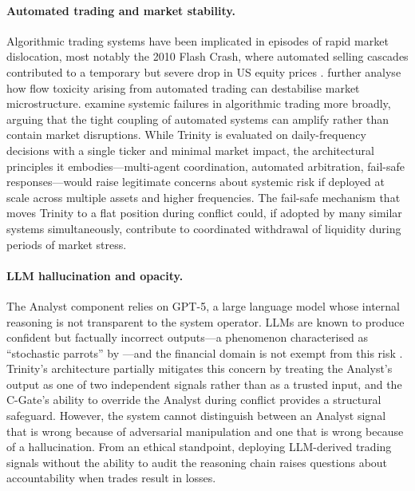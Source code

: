 \paragraph{Automated trading and market stability.}
Algorithmic trading systems have been implicated in episodes of rapid market
dislocation, most notably the 2010 Flash Crash, where automated selling
cascades contributed to a temporary but severe drop in US equity prices
\cite{kirilenko2017flash}. \cite{easley2011} further analyse how flow toxicity
arising from automated trading can destabilise market microstructure.
\cite{doi:10.1177/03063127211048515} examine systemic failures in algorithmic
trading more broadly, arguing that the tight coupling of automated systems
can amplify rather than contain market disruptions. While Trinity is evaluated
on daily-frequency decisions with a single ticker and minimal market impact,
the architectural principles it embodies---multi-agent coordination, automated
arbitration, fail-safe responses---would raise legitimate concerns about
systemic risk if deployed at scale across multiple assets and higher
frequencies. The fail-safe mechanism that moves Trinity to a flat position
during conflict could, if adopted by many similar systems simultaneously,
contribute to coordinated withdrawal of liquidity during periods of market
stress.

\paragraph{LLM hallucination and opacity.}
The Analyst component relies on GPT-5, a large language model whose internal
reasoning is not transparent to the system operator. LLMs are known to produce
confident but factually incorrect outputs---a phenomenon characterised as
``stochastic parrots'' by \cite{10.1145/3442188.3445922}---and the financial
domain is not exempt from this risk \cite{gehrmann2025risks}. Trinity's
architecture partially mitigates this concern by treating the Analyst's output
as one of two independent signals rather than as a trusted input, and the
C-Gate's ability to override the Analyst during conflict provides a structural
safeguard. However, the system cannot distinguish between an Analyst signal
that is wrong because of adversarial manipulation and one that is wrong because
of a hallucination. From an ethical standpoint, deploying LLM-derived trading
signals without the ability to audit the reasoning chain raises questions about
accountability when trades result in losses.

